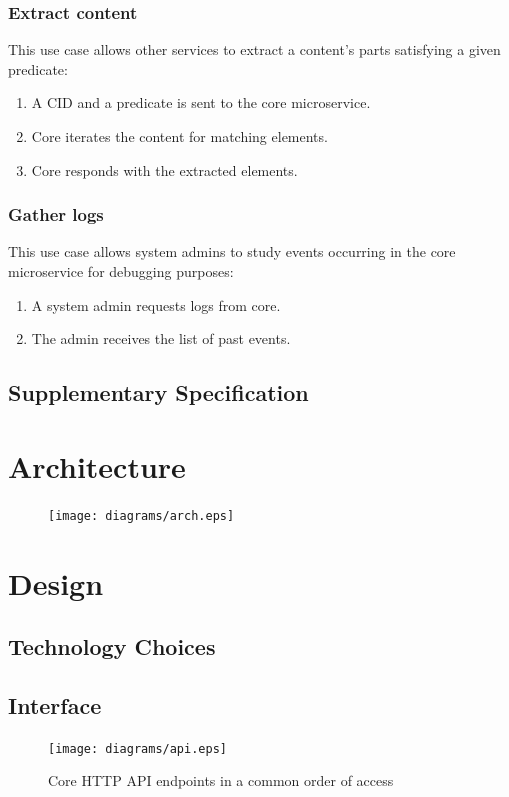\documentclass[a4paper,oneside,12pt]{book}
\begin{document}
\subsubsection{Extract content}
This use case allows other services to extract a content's parts
satisfying a given \gls{predicate}:
\begin{enumerate}
  \item A CID and a \gls{predicate} is sent to the core microservice.
  \item Core iterates the content for matching elements.
  \item Core responds with the extracted elements.
\end{enumerate}

\subsubsection{Gather logs}
This use case allows system admins to study events occurring
in the core microservice for debugging purposes:
\begin{enumerate}
  \item A system admin requests logs from core.
  \item The admin receives the list of past events.
\end{enumerate}

\subsection{Supplementary Specification}

\section{Architecture}
\begin{figure}
  \texttt{[image: diagrams/arch.eps]}
\end{figure}

\section{Design}
\subsection{Technology Choices}

\subsection{Interface}
\begin{figure}
  \texttt{[image: diagrams/api.eps]}
  \caption{Core HTTP API endpoints in a common order of access}
  \label{db}
\end{figure}
\end{document}
